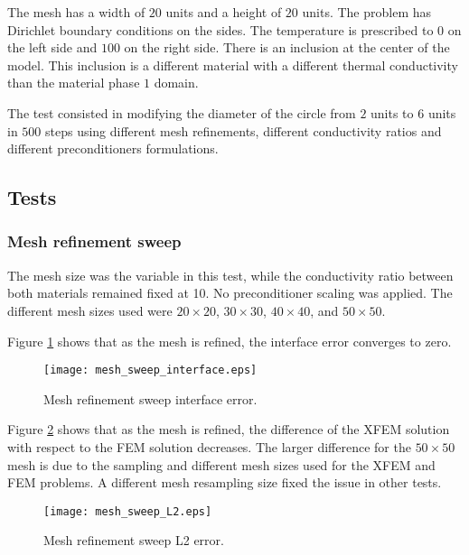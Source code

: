 The mesh has a width of $20$ units and a height of $20$ units. The problem has Dirichlet boundary conditions on the sides. The temperature is prescribed to $0$ on the left side and $100$ on the right side. There is an inclusion at the center of the model. This inclusion is a different material with a different thermal conductivity than the material phase $1$ domain.

The test consisted in modifying the diameter of the circle from $2$ units to $6$ units in $500$ steps using different mesh refinements, different conductivity ratios and different preconditioners formulations.


\subsection{Tests}


\subsubsection{Mesh refinement sweep}

The mesh size was the variable in this test, while the conductivity ratio between both materials remained fixed at 10. No preconditioner scaling was applied. The different mesh sizes used were $20 \times 20$, $30 \times 30$, $40 \times 40$, and $50 \times 50$.

Figure \ref{fig:mesh-sweep-interface} shows that as the mesh is refined, the interface error converges to zero.

\begin{figure}[H]
	\centering
	\texttt{[image: mesh\_sweep\_interface.eps]}
	\caption[Mesh refinement sweep interface error]{Mesh refinement sweep interface error.}
	\label{fig:mesh-sweep-interface}
\end{figure}

Figure \ref{fig:mesh-sweep-L2} shows that as the mesh is refined, the difference of the XFEM solution with respect to the FEM solution decreases. The larger difference for the $50 \times 50$ mesh is due to the sampling and different mesh sizes used for the XFEM and FEM problems. A different mesh resampling size fixed the issue in other tests.
%
\begin{figure}[H]
	\centering
	\texttt{[image: mesh\_sweep\_L2.eps]}
	\caption[Mesh refinement sweep L2 error]{Mesh refinement sweep L2 error.}
	\label{fig:mesh-sweep-L2}
\end{figure}
%

